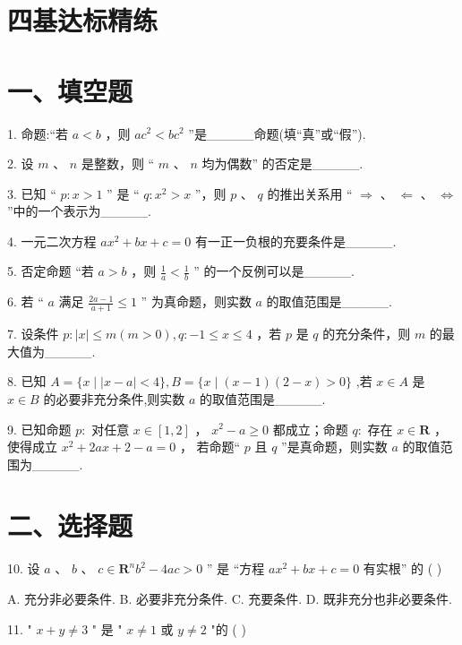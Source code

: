 \section*{四基达标精练}

\section*{一、填空题}

1. 命题:“若 $a < b$ ，则 $a{c}^{2} < b{c}^{2}$ ”是\_\_\_\_\_命题(填“真”或“假”).

2. 设 $m\text{ 、 }n$ 是整数，则 “ $m\text{ 、 }n$ 均为偶数” 的否定是\_\_\_\_\_.

3. 已知 “ $p : x > 1$ ” 是 “ $q : {x}^{2} > x$ ”，则 $p\text{ 、 }q$ 的推出关系用 “ $\Rightarrow$ 、 $\Leftarrow$ 、 $\Leftrightarrow$ ”中的一个表示为\_\_\_\_\_.

4. 一元二次方程 $a{x}^{2} + {bx} + c = 0$ 有一正一负根的充要条件是\_\_\_\_\_.

5. 否定命题 “若 $a > b$ ，则 $\frac{1}{a} < \frac{1}{b}$ ” 的一个反例可以是\_\_\_\_\_.

6. 若 “ $a$ 满足 $\frac{{2a} - 1}{a + 1} \leq  1$ ” 为真命题，则实数 $a$ 的取值范围是\_\_\_\_\_.

7. 设条件 $p : \left| x\right|  \leq  m\left( {m > 0}\right) ,q :  - 1 \leq  x \leq  4$ ，若 $p$ 是 $q$ 的充分条件，则 $m$ 的最大值为\_\_\_\_\_.

8. 已知 $A = \{ x \mid  \left| {x - a}\right|  < 4\} ,B = \{ x \mid  \left( {x - 1}\right) \left( {2 - x}\right)  > 0\}$ ,若 $x \in  A$ 是 $x \in  B$ 的必要非充分条件,则实数 $a$ 的取值范围是\_\_\_\_\_.

9. 已知命题 $p :$ 对任意 $x \in  \left\lbrack  {1,2}\right\rbrack$ ， ${x}^{2} - a \geq  0$ 都成立；命题 $q :$ 存在 $x \in  \mathbf{R}$ ，使得成立 ${x}^{2} + {2ax} + 2 - a = 0$ ， 若命题“ $p$ 且 $q$ ”是真命题，则实数 $a$ 的取值范围为\_\_\_\_\_.

\section*{二、选择题}

10. 设 $a\text{ 、 }b\text{ 、 }c \in  {\mathbf{R}}^{n}{b}^{2} - {4ac} > 0$ ” 是 “方程 $a{x}^{2} + {bx} + c = 0$ 有实根” 的 ( )

A. 充分非必要条件. B. 必要非充分条件. C. 充要条件. D. 既非充分也非必要条件.

11. " $x + y \neq  3$ " 是 " $x \neq  1$ 或 $y \neq  2$ "的 ( )


